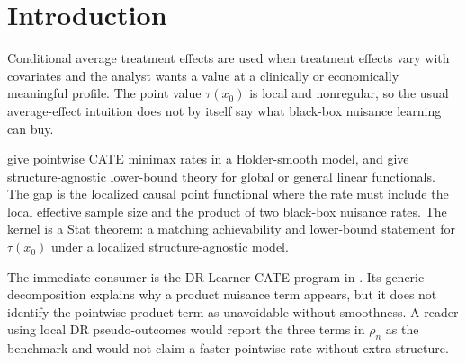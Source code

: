 \documentclass[11pt]{article}
\theoremstyle{definition}
\theoremstyle{plain}
\theoremstyle{remark}
\begin{document}
\section{Introduction}
Conditional average treatment effects are used when treatment effects vary with covariates and the analyst wants a value at a clinically or economically meaningful profile. The point value $\tau(x_0)$ is local and nonregular, so the usual average-effect intuition does not by itself say what black-box nuisance learning can buy.

\citet{KennedyBalakrishnanRobinsWasserman2024MinimaxCATE} give pointwise CATE minimax rates in a Holder-smooth model, and \citet{JinSyrgkanis2024StructureAgnosticDR,JinSyrgkanis2025GeneralLinearFunctionalLowerBounds} give structure-agnostic lower-bound theory for global or general linear functionals. The gap is the localized causal point functional where the rate must include the local effective sample size and the product of two black-box nuisance rates. The kernel is a Stat theorem: a matching achievability and lower-bound statement for $\tau(x_0)$ under a localized structure-agnostic model.

The immediate consumer is the DR-Learner CATE program in \citet{Kennedy2023DRCATE}. Its generic decomposition explains why a product nuisance term appears, but it does not identify the pointwise product term as unavoidable without smoothness. A reader using local DR pseudo-outcomes would report the three terms in $\rho_n$ as the benchmark and would not claim a faster pointwise rate without extra structure.
\end{document}
